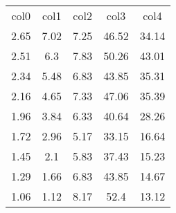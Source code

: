 \begin{table}
\begin{tabular}{ccccc}
col0 & col1 & col2 & col3 & col4 \\
2.65 & 7.02 & 7.25 & 46.52 & 34.14 \\
2.51 & 6.3 & 7.83 & 50.26 & 43.01 \\
2.34 & 5.48 & 6.83 & 43.85 & 35.31 \\
2.16 & 4.65 & 7.33 & 47.06 & 35.39 \\
1.96 & 3.84 & 6.33 & 40.64 & 28.26 \\
1.72 & 2.96 & 5.17 & 33.15 & 16.64 \\
1.45 & 2.1 & 5.83 & 37.43 & 15.23 \\
1.29 & 1.66 & 6.83 & 43.85 & 14.67 \\
1.06 & 1.12 & 8.17 & 52.4 & 13.12 \\
\end{tabular}
\end{table}

